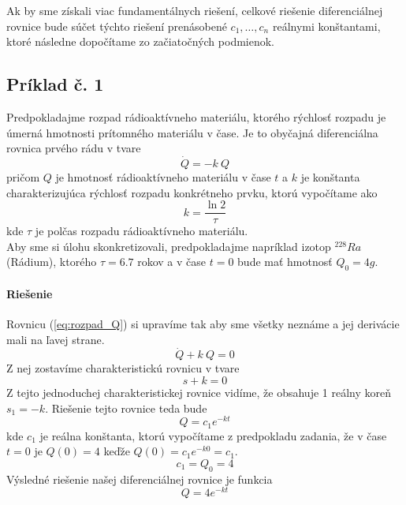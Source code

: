 \documentclass[a4paper, 10pt, ]{article}
\begin{document}
Ak by sme získali viac fundamentálnych riešení, celkové riešenie diferenciálnej rovnice bude súčet týchto riešení prenásobené $c_{1}, \dots, c_{n}$ reálnymi konštantami, ktoré následne dopočítame zo začiatočných podmienok.





\subsection{Príklad č. 1}

Predpokladajme rozpad rádioaktívneho materiálu, ktorého rýchlosť rozpadu je úmerná hmotnosti prítomného materiálu v čase. Je to obyčajná diferenciálna rovnica prvého rádu v tvare
\begin{equation}\label{eq:rozpad_Q}
    \Dot{Q} = -k \  Q
\end{equation}
pričom $Q$ je hmotnosť rádioaktívneho materiálu v čase $t$ a $k$ je konštanta charakterizujúca rýchlosť rozpadu konkrétneho prvku, ktorú vypočítame ako
\begin{equation}
    k = \frac{\ln{2}}{\tau}
\end{equation}
kde $\tau$ je polčas rozpadu rádioaktívneho materiálu.\\

Aby sme si úlohu skonkretizovali, predpokladajme napríklad izotop $^{228}Ra$ (Rádium), ktorého $\tau = 6.7$ rokov a v čase $t=0$ bude mať hmotnosť $Q_{0} = 4 g$. 


\paragraph{Riešenie}

Rovnicu (\ref{eq:rozpad_Q}) si upravíme tak aby sme všetky neznáme a jej derivácie mali na ľavej strane. 
\begin{equation}\label{eq:rozpad_Q2}
    \Dot{Q} + k \  Q = 0
\end{equation}
Z nej zostavíme charakteristickú rovnicu v tvare
\begin{equation}
    s + k = 0
\end{equation}
Z tejto jednoduchej charakteristickej rovnice vidíme, že obsahuje 1 reálny koreň $s_1 = -k$. Riešenie tejto rovnice teda bude
\begin{equation}
    Q = c_1 e^{-kt}
\end{equation}
kde $c_1$ je reálna konštanta, ktorú vypočítame z predpokladu zadania, že v čase $t = 0$ je $Q(0) = 4$ keďže $Q(0) = c_1 e^{-k 0} = c_1$.
\begin{equation}
    c_{1} = Q_{0} = 4
\end{equation}
Výsledné riešenie našej diferenciálnej rovnice je funkcia
\begin{equation}
    Q = 4 e^{-kt}
\end{equation}
\end{document}
